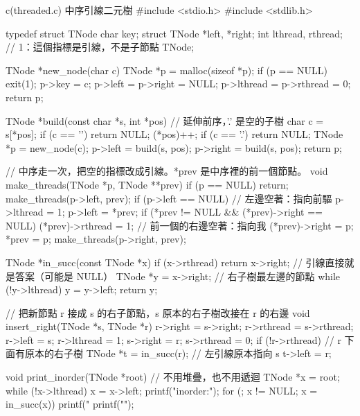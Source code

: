 \begin{example}[label=ex:bt-thread]{c}{(threaded.c) 中序引線二元樹}
#include <stdio.h>
#include <stdlib.h>

typedef struct TNode {
    char key;
    struct TNode *left, *right;
    int lthread, rthread;       // 1：這個指標是引線，不是子節點
} TNode;

TNode *new_node(char c)
{
    TNode *p = malloc(sizeof *p);
    if (p == NULL) {
        exit(1);
    }
    p->key = c;
    p->left = p->right = NULL;
    p->lthread = p->rthread = 0;
    return p;
}

TNode *build(const char *s, int *pos)   // 延伸前序，'.' 是空的子樹
{
    char c = s[*pos];
    if (c == '\0') {
        return NULL;
    }
    (*pos)++;
    if (c == '.') {
        return NULL;
    }
    TNode *p = new_node(c);
    p->left = build(s, pos);
    p->right = build(s, pos);
    return p;
}

// 中序走一次，把空的指標改成引線。*prev 是中序裡的前一個節點。
void make_threads(TNode *p, TNode **prev)
{
    if (p == NULL) {
        return;
    }
    make_threads(p->left, prev);
    if (p->left == NULL) {          // 左邊空著：指向前驅
        p->lthread = 1;
        p->left = *prev;
    }
    if (*prev != NULL && (*prev)->right == NULL) {
        (*prev)->rthread = 1;       // 前一個的右邊空著：指向我
        (*prev)->right = p;
    }
    *prev = p;
    make_threads(p->right, prev);
}

TNode *in_succ(const TNode *x)
{
    if (x->rthread) {
        return x->right;            // 引線直接就是答案（可能是 NULL）
    }
    TNode *y = x->right;            // 右子樹最左邊的節點
    while (!y->lthread) {
        y = y->left;
    }
    return y;
}

// 把新節點 r 接成 s 的右子節點，s 原本的右子樹改接在 r 的右邊
void insert_right(TNode *s, TNode *r)
{
    r->right = s->right;
    r->rthread = s->rthread;
    r->left = s;
    r->lthread = 1;
    s->right = r;
    s->rthread = 0;
    if (!r->rthread) {              // r 下面有原本的右子樹
        TNode *t = in_succ(r);      // 左引線原本指向 s
        t->left = r;
    }
}

void print_inorder(TNode *root)     // 不用堆疊，也不用遞迴
{
    TNode *x = root;
    while (!x->lthread) {
        x = x->left;
    }
    printf("inorder:");
    for (; x != NULL; x = in_succ(x)) {
        printf(" %
    }
    printf("\n");
}


\end{example}
